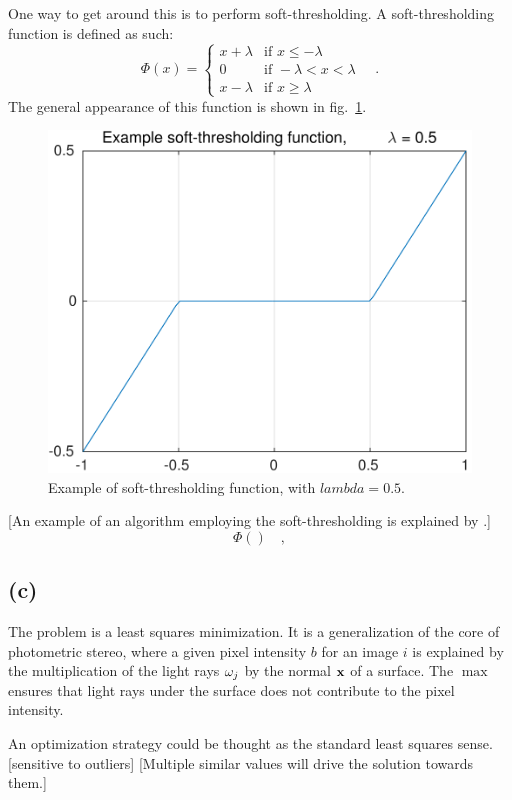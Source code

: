 \documentclass{report}
\begin{document}
One way to get around this is to perform soft-thresholding. A soft-thresholding function is defined as such:
\begin{equation}
\Phi(x) = 
\begin{cases}
  x + \lambda & \text{if } x\leq -\lambda \\ 
  0           & \text{if } -\lambda < x < \lambda \\
  x - \lambda & \text{if } x\geq \lambda
\end{cases}
\quad.
\end{equation}
The general appearance of this function is shown in fig.~\ref{q5b:soft-thresh}.

\begin{figure}
  \centering
  \includegraphics[width=0.45\linewidth]{q5c_soft_threshold_example.pdf}
  \caption[ Example soft-thresholding function ]
   {Example of soft-thresholding function, with $lambda = 0.5$.}
  \label{q5b:soft-thresh}
\end{figure}


[An example of an algorithm employing the soft-thresholding is explained by \cite{Kowalski2015}.]
\begin{equation}
\Phi \left(  \right)
\quad,
\end{equation}



\subsection{(c)}

The problem is a least squares minimization. It is a generalization of the core of photometric stereo, where a given pixel intensity $b$ for an image $i$ is explained by the multiplication of the light rays $\mathbf{\omega}_j$ by the normal $\mathbf{x}$ of a surface. The $\max$ ensures that light rays under the surface does not contribute to the pixel intensity.

An optimization strategy could be thought as the standard least squares sense.
[sensitive to outliers] [Multiple similar values will drive the solution towards them.]
\end{document}
